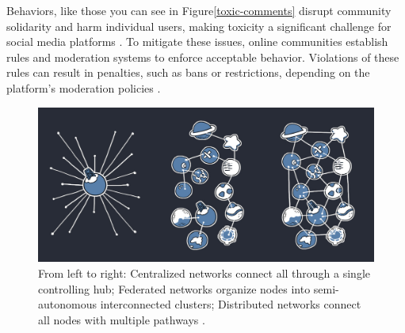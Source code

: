 Behaviors, like those you can see in Figure\ref{toxic-comments} disrupt community solidarity and harm individual users, making toxicity a significant challenge for social media platforms \cite{fan:2022,wulczyn:2017}. To mitigate these issues, online communities establish rules and moderation systems to enforce acceptable behavior. Violations of these rules can result in penalties, such as bans or restrictions, depending on the platform's moderation policies \cite{nicholson:2023}.

\begin{figure}[tb]
  \centering
  \includegraphics[width=\textwidth]{../material/network_models.jpg}
  \caption{From left to right: Centralized networks connect all through a single controlling hub; Federated networks organize nodes into semi-autonomous interconnected clusters; Distributed networks connect all nodes with multiple pathways \cite{mastodon:docs}.}
  \label{network-models}
\end{figure}

